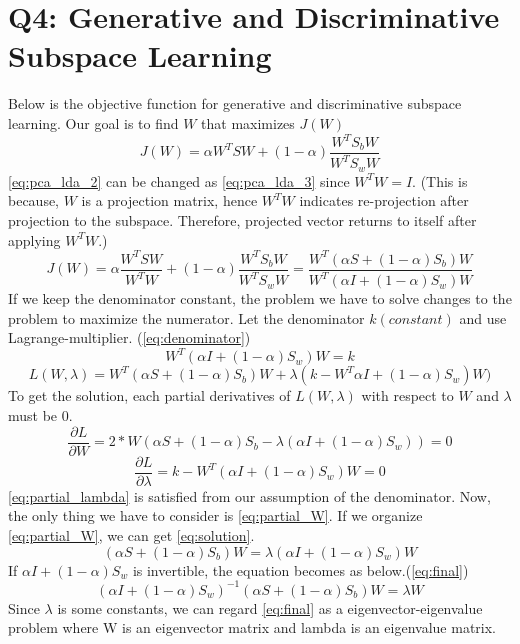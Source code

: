 \section{Q4: Generative and Discriminative Subspace Learning}
\label{subsec:Q4}
\label{sec:intro}
Below is the objective function for generative and discriminative subspace learning. Our goal is to find $W$ that maximizes $J(W)$
\begin{equation}
	J(W) = \alpha W^TSW+(1-\alpha) \frac{W^TS_bW}{W^TS_wW}
	\label{eq:pca_lda_2}
\end{equation}
\cref{eq:pca_lda_2} can be changed as \cref{eq:pca_lda_3} since $W^TW=I$. (This is because, $W$ is a projection matrix, hence $W^TW$ indicates re-projection after projection to the subspace. Therefore, projected vector returns to itself after applying $W^TW$.)
\begin{equation}
	J(W) = \alpha \frac{W^TSW}{W^TW}+(1-\alpha) \frac{W^TS_bW}{W^TS_wW}
	= \frac{W^T(\alpha S + (1-\alpha)S_b)W}{W^T(\alpha I + (1-\alpha)S_w)W}
	\label{eq:pca_lda_3}
\end{equation}
If we keep the denominator constant, the problem we have to solve changes to the problem to maximize the numerator. Let the denominator $k(constant)$ and use Lagrange-multiplier. (\cref{eq:denominator})
\begin{equation}
	W^T(\alpha I + (1-\alpha)S_w)W = k
	\label{eq:denominator}
\end{equation}
\begin{equation}
	L(W,\lambda)=W^T(\alpha S + (1-\alpha)S_b)W
	+ \lambda(k-W^T\alpha I + (1-\alpha)S_w)W)
	\label{eq:lagrange}
\end{equation}
To get the solution, each partial derivatives of $L(W,\lambda)$ with respect to $W$ and $\lambda$ must be 0.
\begin{equation}
	\frac{\partial L}{\partial W} = 2*W(\alpha S+(1-\alpha)S_b
	-\lambda(\alpha I+(1-\alpha)S_w))=0
	\label{eq:partial_W}
\end{equation}
\begin{equation}
	\frac{\partial L}{\partial \lambda} = k - W^T(\alpha I+(1-\alpha)S_w)W=0
	\label{eq:partial_lambda}
\end{equation}
\cref{eq:partial_lambda} is satisfied from our assumption of the denominator. Now, the only thing we have to consider is \cref{eq:partial_W}. If we organize \cref{eq:partial_W}, we can get \cref{eq:solution}.
\begin{equation}
	(\alpha S+(1-\alpha)S_b)W = \lambda (\alpha I + (1-\alpha)S_w)W
	\label{eq:solution}
\end{equation}
If $\alpha I + (1-\alpha)S_w$ is invertible, the equation becomes as below.(\cref{eq:final})
\begin{equation}
	(\alpha I + (1-\alpha)S_w)^{-1}(\alpha S+(1-\alpha)S_b)W = \lambda W
	\label{eq:final}
\end{equation}
Since $\lambda$ is some constants, we can regard \cref{eq:final} as a eigenvector-eigenvalue problem where W is an eigenvector matrix and lambda is an eigenvalue matrix.

